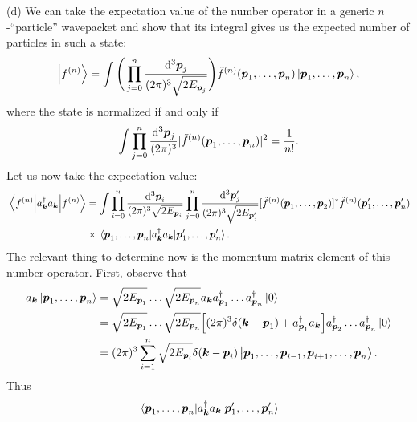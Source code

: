 {(d) We can take the expectation value of the number operator in a generic $n$-``particle'' wavepacket and show that its integral gives us the expected number of particles in such a state:
\begin{align}
    \ket{f^{(n)}} = \int \Bigg( \prod_{j=0}^{n} \frac{\dd[3]{\vb*{p}_{j}}}{(2 \pi)^3 \sqrt{2 E_{\vb*{p}_{j}}}} \Bigg) \tilde{f}^{(n)}(\vb*{p}_{1},\ldots,\vb*{p}_{n}) \ket{\vb*{p}_{1},\ldots,\vb*{p}_{n}}
,\end{align}
where the state is normalized if and only if
\begin{align}
    \int \prod_{j=0}^{n} \frac{\dd[3]{\vb*{p}_{j}}}{(2 \pi)^3} | \tilde{f}^{(n)}(\vb*{p}_{1},\ldots,\vb*{p}_{n}) |^2 = \frac{1}{n!}
.\end{align}
Let us now take the expectation value:
\begin{align}
    \mel{f^{(n)}}{a_{\vb*{k}}^{\dagger} a_{\vb*{k}}}{f^{(n)}} &= \int \prod_{i=0}^{n} \frac{\dd[3]{\vb*{p}_{i}}}{(2 \pi)^3 \sqrt{2 E_{\vb*{p}_{i}}}} \prod_{j=0}^{n} \frac{\dd[3]{\vb*{p}_{j}'}}{(2 \pi)^3 \sqrt{2 E_{\vb*{p}_{j}'}}} [\tilde{f}^{(n)}(\vb*{p}_{1},\ldots,\vb*{p}_{2})]^{*} \tilde{f}^{(n)}(\vb*{p}_{1}',\ldots,\vb*{p}_{n}') \nonumber \\
                                                              &\times \mel{\vb*{p}_{1},\ldots,\vb*{p}_{n}}{a_{\vb*{k}}^{\dagger} a_{\vb*{k}}}{\vb*{p}_{1}',\ldots,\vb*{p}_{n}'}
.\end{align}
The relevant thing to determine now is the momentum matrix element of this number operator.
First, observe that
\begin{align}
    a_{\vb*{k}} \ket{\vb*{p}_{1},\ldots,\vb*{p}_{n}} &= \sqrt{2 E_{\vb*{p}_{1}}} \ldots \sqrt{2 E_{\vb*{p}_{n}}} a_{\vb*{k}} a_{\vb*{p}_{1}}^{\dagger} \ldots a_{\vb*{p}_{n}}^{\dagger} \ket{0} \nonumber \\
    &= \sqrt{2 E_{\vb*{p}_{1}}} \ldots \sqrt{2 E_{\vb*{p}_{n}}} \Big[ (2 \pi)^3 \delta(\vb*{k} - \vb*{p}_{1}) + a_{\vb*{p}_{1}}^{\dagger} a_{\vb*{k}} \Big] a_{\vb*{p}_{2}}^{\dagger} \ldots a_{\vb*{p}_{n}}^{\dagger} \ket{0} \nonumber \\
    &= (2 \pi)^3 \sum_{i=1}^{n} \sqrt{2 E_{\vb*{p}_{i}}} \delta(\vb*{k} - \vb*{p}_{i}) \ket{\vb*{p}_{1},\ldots,\vb*{p}_{i-1},\vb*{p}_{i+1},\ldots,\vb*{p}_{n}}
.\end{align}
Thus
\begin{align}
    &\mel{\vb*{p}_{1},\ldots,\vb*{p}_{n}}{a_{\vb*{k}}^{\dagger} a_{\vb*{k}}}{\vb*{p}_{1}',\ldots,\vb*{p}_{n}'} \nonumber \\

\end{align}}
